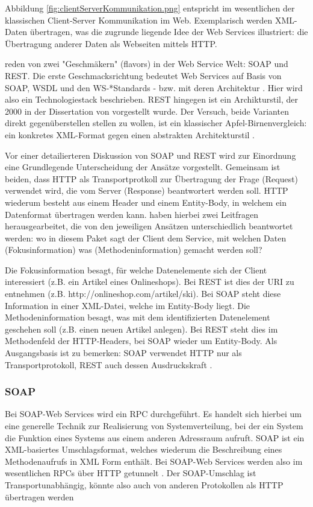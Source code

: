 \documentclass[12pt,a4paper,bibliography=totocnumbered,listof=totoc]{scrartcl}
\begin{document}
Abbildung \ref{fig:clientServerKommunikation.png} entspricht im wesentlichen der klassischen Client-Server Kommunikation im Web. Exemplarisch werden XML-Daten übertragen, was die zugrunde liegende Idee der Web Services illustriert: die Übertragung anderer Daten als Webseiten mittels HTTP.

\citet{wilde11} reden von zwei "Geschmäkern" (flavors) in der Web Service Welt: SOAP und REST. Die erste Geschmacksrichtung bedeutet Web Services \glqq auf Basis von SOAP, WSDL und den WS-*Standards - bzw. mit deren Architektur\grqq{} \citep{tilkov11}. Hier wird also ein Technologiestack beschrieben. REST hingegen ist ein Archikturstil, der 2000 in der Dissertation von \citeauthor{fielding00} vorgestellt wurde. Der Versuch, beide Varianten direkt gegenüberstellen stellen zu wollen, ist ein \glqq [...] klassischer Apfel-Birnenvergleich: ein konkretes XML-Format gegen einen abstrakten Architekturstil\grqq{} \citep{tilkov11}.

Vor einer detailierteren Diskussion von SOAP und REST wird zur Einordnung eine Grundlegende Unterscheidung der Ansätze vorgestellt. Gemeinsam ist beiden, dass HTTP als Transportprotkoll zur Übertragung der Frage (Request) verwendet wird, die vom Server (Response) beantwortert werden soll. HTTP wiederum besteht aus einem Header und einem Entity-Body, in welchem ein Datenformat übertragen werden kann. \citet{richardson07} haben hierbei zwei Leitfragen herausgearbeitet, die von den jeweiligen Ansätzen unterschiedlich beantwortet werden: wo in diesem Paket sagt der Client dem Service, mit welchen Daten (Fokusinformation) was (Methodeninformation) gemacht werden soll?

Die Fokusinformation besagt, für welche Datenelemente sich der Client interessiert (z.B. ein Artikel eines Onlineshops). Bei REST ist dies der URI zu entnehmen (z.B. http://onlineshop.com/artikel/ski). Bei SOAP steht diese Information in einer XML-Datei, welche im Entity-Body liegt. Die Methodeninformation besagt, was mit dem identifizierten Datenelement geschehen soll (z.B. einen neuen Artikel anlegen). Bei REST steht dies im Methodenfeld der HTTP-Headers, bei SOAP wieder um Entity-Body. Als Ausgangsbasis ist zu bemerken: SOAP verwendet HTTP nur als Transportprotokoll, REST auch dessen Ausdruckskraft \citep{wilde11}.

\subsubsection{SOAP}
Bei SOAP-Web Services wird ein \ac{RPC} durchgeführt. Es handelt sich hierbei um eine generelle Technik zur Realisierung von Systemverteilung, bei der ein System die Funktion eines Systems aus einem anderen Adressraum aufruft. SOAP ist ein XML-basiertes Umschlagsformat, welches wiederum die Beschreibung eines Methodenaufrufs in XML Form enthält. Bei SOAP-Web Services werden also im wesentlichen \ac{RPC}s über HTTP getunnelt \citep{wilde11}. Der SOAP-Umschlag ist Transportunabhängig, könnte also auch von anderen Protokollen als HTTP übertragen werden \citep{tilkov11}
\end{document}
